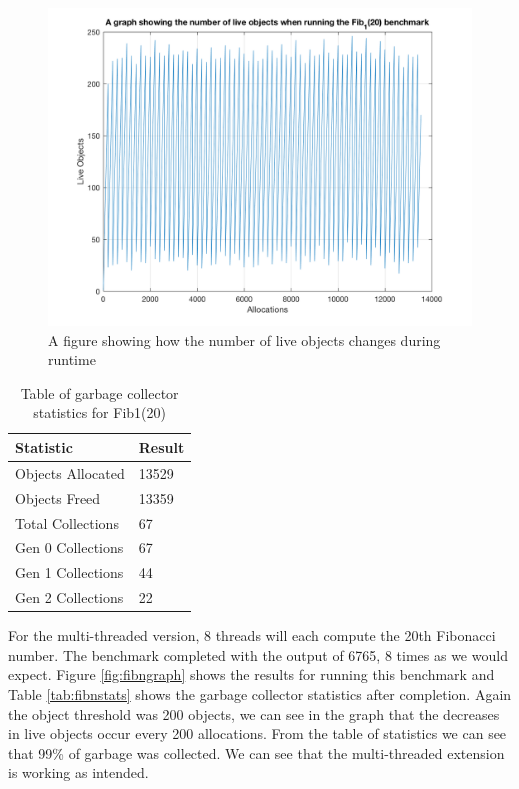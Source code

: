\documentclass[../diss.tex]{subfiles}
\begin{document}
\begin{figure}
    \centering
    \includegraphics[max width=\linewidth]{figs/fib1.png}
    \caption{A figure showing how the number of live objects changes during runtime}
    \label{fig:fib1graph}
\end{figure}

\begin{table}
    \centering
    \begin{tabular}{| l | l |}
        \hline
         \bf{Statistic} & \bf{Result} \\ \hline
         Objects Allocated & 13529 \\ \hline
         Objects Freed & 13359 \\ \hline
         Total Collections & 67 \\ \hline
         Gen 0 Collections & 67 \\ \hline
         Gen 1 Collections & 44 \\ \hline
         Gen 2 Collections & 22 \\ \hline
    \end{tabular}
    \caption{Table of garbage collector statistics for Fib1(20)}
    \label{tab:fib1stats}
\end{table}

For the multi-threaded version, 8 threads will each compute the 20th Fibonacci number. The benchmark completed with the output of 6765, 8 times as we would expect. Figure \ref{fig:fibngraph} shows the results for running this benchmark and Table \ref{tab:fibnstats} shows the garbage collector statistics after completion. Again the object threshold was 200 objects, we can see in the graph that the decreases in live objects occur every 200 allocations. From the table of statistics we can see that 99\% of garbage was collected. We can see that the multi-threaded extension is working as intended.
\end{document}
